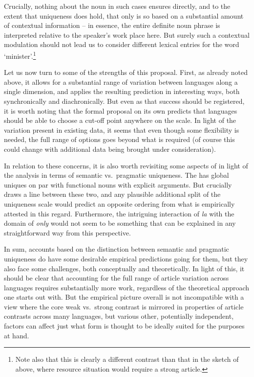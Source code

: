 \documentclass[output=paper
,modfonts
,nonflat]{langscibook}
\begin{document}
Crucially, nothing about the noun in such cases ensures 
directly, and to the extent that uniqueness does hold, that only is so
based on a substantial amount of contextual information -- in essence,
the entire definite noun phrase is interpreted relative to the
speaker's work place here. But surely such a contextual modulation
should not lead us to consider different lexical entries for the word
`minister'.\footnote{Note also that this is clearly a different
  contrast than that in the sketch of  above, where
  resource situation would require a strong article.}


Let us now turn to some of the strengths of this proposal. First, as
already noted above, it allows for a substantial range of variation
between languages along a single dimension, and \citet{Ortmann2014}
applies the resulting prediction in interesting ways, both
synchronically and diachronically. But even as that success should be
registered, it is worth noting that the formal proposal on its own
predicts that languages should be able to choose a cut-off point anywhere
on the scale. In light of the variation present in existing data, it
seems that even though some flexibility is needed, the full range of
options goes beyond what is required (of course this could change with
additional data being brought under consideration). 

In relation to these concerns, it is also worth revisiting some aspects
of  in light of the analysis in terms of semantic vs.\
pragmatic uniqueness. The  has global uniques on par
with \is{nouns}functional nouns with explicit arguments. But 
crucially draws  a line between these two, and any plausible
additional split of the uniqueness scale would predict an opposite
ordering from what is empirically attested in this
regard. Furthermore, the intriguing interaction of \textit{la} with
the domain of \textit{only} would not seem to be something that can be
explained in any straightforward way from this perspective. 

In sum, accounts based on the distinction between semantic and
pragmatic uniqueness do have some desirable empirical predictions going
for them, but they also face some challenges, both conceptually and
theoretically. In light of this, it should be clear that accounting
for the full range of article variation across languages requires
substantially more work, regardless of the theoretical approach one
starts out with. But the empirical picture overall is not
incompatible with a view where the core weak vs.\ strong contrast is
mirrored in properties of article contrasts across many languages, but
various other, potentially independent, factors can affect just what
form is thought to be ideally suited for the purposes at hand.
\end{document}
